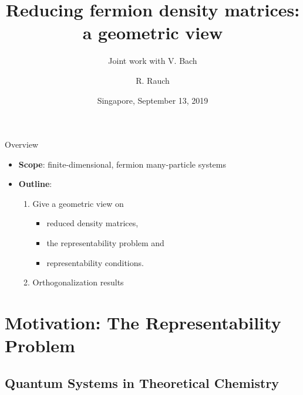 \documentclass{beamer}
\title{Reducing fermion density matrices: a geometric view}
\subtitle{\hfill Joint work with V. Bach}
\author{R. Rauch}
\date{Singapore, September 13, 2019}
\begin{document}
\begin{frame}[plain]
\titlepage
\end{frame}

\begin{frame}{Overview}
  \begin{itemize}
    \item \textbf{Scope}: finite-dimensional, fermion many-particle systems
    \item \textbf{Outline}:
      \begin{enumerate}
        \item Give a geometric view on
          \begin{itemize}
            \item reduced density matrices,
            \item the representability problem and
            \item representability conditions.
          \end{itemize}
        \item Orthogonalization results \parencite{Bach2019}
      \end{enumerate}
  \end{itemize}
\end{frame}

\section{Motivation: The Representability Problem}
\subsection{Quantum Systems in Theoretical Chemistry}
\frame{\sectionpage}
\end{document}
